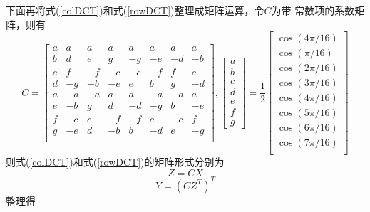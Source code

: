 \documentclass{article}
\numberwithin {equation}{section}
\begin{document}
\begin{spacing}{1.25}
      下面再将式(\ref{colDCT})和式(\ref{rowDCT})整理成矩阵运算，令$C$为带
      常数项的系数矩阵，则有
      \begin{equation}
        C=\begin{bmatrix}
          a & a   & a   & a   & a   & a   & a   & a\\
          b & d   & e   & g   & -g  & -e  & -d  & -b\\
          c & f   & -f  & -c  & -c  & -f  & f   & c\\
          d & -g  & -b  & -e  & e   & b   & g   & -d\\
          a & -a  & -a  & a   & a   & -a  & -a  & a\\
          e & -b  & g   & d   & -d  & -g  & b   & -e\\
          f & -c  & c   & -f  & -f  & c   & -c  & f\\
          g & -e  & d   & -b  & b   & -d  & e   & -g\\
        \end{bmatrix},
        \begin{bmatrix}
          a \\ b \\ c \\ d \\ e \\ f \\ g
        \end{bmatrix}=
        \frac{1}{2}\begin{bmatrix}
          \cos(4\pi/16)\\
          \cos(\pi/16)\\
          \cos(2\pi/16)\\
          \cos(3\pi/16)\\
          \cos(4\pi/16)\\
          \cos(5\pi/16)\\
          \cos(6\pi/16)\\
          \cos(7\pi/16)\\
        \end{bmatrix}
        \label{C}
      \end{equation}
      则式(\ref{colDCT})和式(\ref{rowDCT})的矩阵形式分别为
      \begin{equation}
        Z=CX 
        \label{col}
      \end{equation}
      \begin{equation}
        Y=(CZ^{T})^{T}
      \end{equation}
      整理得
      \begin{equation}

\end{equation}
\end{spacing}
\end{document}

